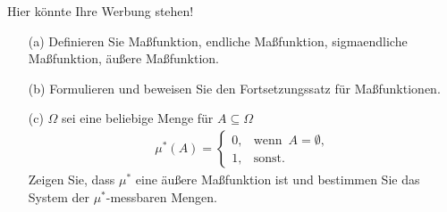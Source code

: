 \begin{exercise}

Hier könnte Ihre Werbung stehen!

\begin{itemize}
  \item[(a)] Definieren Sie Maßfunktion, endliche Maßfunktion, sigmaendliche Maßfunktion, äußere Maßfunktion.
  \item[(b)] Formulieren und beweisen Sie den Fortsetzungssatz für Maßfunktionen.
  \item[(c)] $\Omega$ sei eine beliebige Menge für $A \subseteq \Omega$
  \begin{align*}
    \mu^\ast(A) =
    \begin{cases}
      0, & \text{wenn} \enspace A = \emptyset, \\
      1, & \text{sonst}.
    \end{cases}
  \end{align*}
  Zeigen Sie, dass $\mu^\ast$ eine äußere Maßfunktion ist und bestimmen Sie das System der $\mu^\ast$-messbaren Mengen.
\end{itemize}

\end{exercise}


